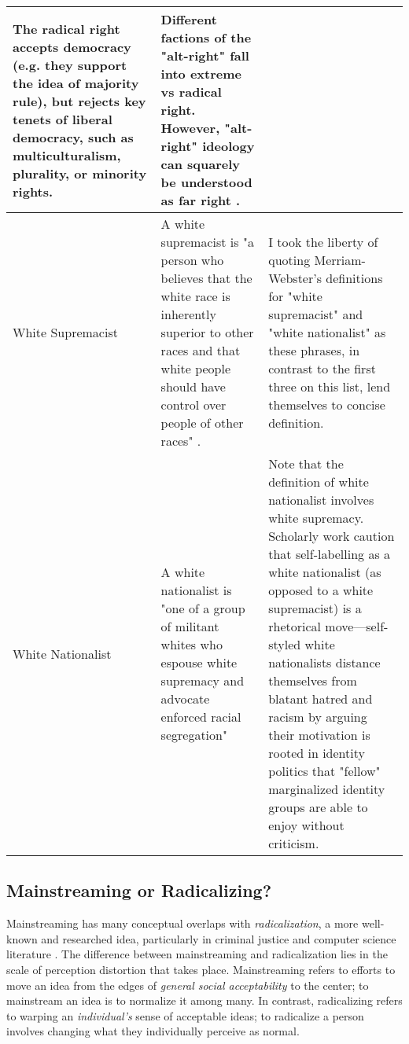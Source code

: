 \documentclass[acmlarge, screen, authorversion]{acmart}
\begin{document}
\begin{table*}
\begin{tabular}{ p{3cm}  p{7cm}  p{6cm} }
  \medskip 
  
  The radical right accepts democracy (e.g. they support the idea of majority rule), but rejects key tenets of liberal democracy, such as multiculturalism, plurality, or minority rights. & Different factions of the "alt-right" fall into extreme vs radical right. However, "alt-right" ideology can squarely be understood as far right \cite{muddeFarRightToday2019}.\\
  \hline
  White Supremacist & A white supremacist is "a person who believes that the white race is inherently superior to other races and that white people should have control over people of other races" \cite{merriam-websterDefinitionWHITESUPREMACIST}. & I took the liberty of quoting Merriam-Webster's definitions for "white supremacist" and "white nationalist" as these phrases, in contrast to the first three on this list, lend themselves to concise definition.\\
  \hline
  White Nationalist & A white nationalist is "one of a group of militant whites who espouse white supremacy and advocate enforced racial segregation" \cite{merriam-websterDefinitionWHITENATIONALIST} & Note that the definition of white nationalist involves white supremacy. Scholarly work \cite{danielsAlgorithmicRiseAltRight2018,  hartzellAltWhiteConceptualizingAltRight} caution that self-labelling as a white nationalist (as opposed to a white supremacist) is a rhetorical move---self-styled white nationalists distance themselves from blatant hatred and racism by arguing their motivation is rooted in identity politics that "fellow" marginalized identity groups are able to enjoy without criticism. \\
  \bottomrule
\end{tabular}
\end{table*}

\subsection{Mainstreaming or Radicalizing?}

Mainstreaming has many conceptual overlaps with \textit{radicalization}, a more well-known and researched idea,
particularly in criminal justice and computer science literature \cite{torokDevelopingExplanatoryModel2013, groverDetectingPotentialWarning2019, ribeiroAuditingRadicalizationPathways2019}. The
difference between mainstreaming and radicalization lies in the scale of
perception distortion that takes place. Mainstreaming refers to efforts to move an idea from the edges of \textit{general social acceptability} to the center; to mainstream an idea is to
normalize it among many. In contrast, radicalizing refers to warping an \textit{individual's} sense of acceptable
ideas; to radicalize a person involves changing what they individually perceive as normal.
\end{document}
